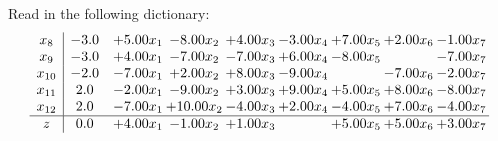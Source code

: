 \documentclass[9pt]{article}
\begin{document}
Read in the following dictionary:
\[\begin{array}{c| c c@{\hskip 2pt} c@{\hskip 2pt} c@{\hskip 2pt} c@{\hskip 2pt} c@{\hskip 2pt} c@{\hskip 2pt} c@{\hskip 2pt} }
 x_{8}   &  -3.0 & +  5.00 x_{1} & -8.00 x_{2} & +  4.00 x_{3} & -3.00 x_{4} & +  7.00 x_{5} & +  2.00 x_{6} & -1.00 x_{7}\\
 x_{9}   &  -3.0 & +  4.00 x_{1} & -7.00 x_{2} & -7.00 x_{3} & +  6.00 x_{4} & -8.00 x_{5} &   & -7.00 x_{7}\\
 x_{10}   &  -2.0 & -7.00 x_{1} & +  2.00 x_{2} & +  8.00 x_{3} & -9.00 x_{4} &   & -7.00 x_{6} & -2.00 x_{7}\\
 x_{11}   &  2.0 & -2.00 x_{1} & -9.00 x_{2} & +  3.00 x_{3} & +  9.00 x_{4} & +  5.00 x_{5} & +  8.00 x_{6} & -8.00 x_{7}\\
 x_{12}   &  2.0 & -7.00 x_{1} & + 10.00 x_{2} & -4.00 x_{3} & +  2.00 x_{4} & -4.00 x_{5} & +  7.00 x_{6} & -4.00 x_{7}\\
\hline
z    &  0.0 & +  4.00 x_{1} & -1.00 x_{2} & +  1.00 x_{3} &   & +  5.00 x_{5} & +  5.00 x_{6} & +  3.00 x_{7}\\
\end{array}\]
\end{document}
